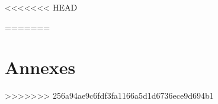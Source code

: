 \documentclass[12pt,oneside,a4paper]{article}
\begin{document}


\tableofcontents
\newpage

<<<<<<< HEAD

\newpage

\newpage





\newpage

\newpage


\newpage

\newpage

\nocite{*}
\printbibliography
\newpage
=======
% 
 
 \newpage
 
 
 \newpage
 
 \newpage
 
 \newpage 
 
 \part*{Annexes}
 \appendix
 
 \newpage 
 
  \newpage 
  
>>>>>>> 256a94ae9c6fdf3fa1166a5d1d6736ece9d694b1
\end{document}
